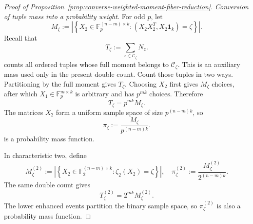 \documentclass[11pt]{article}
\newcommand{\F}{\mathbb F}
\newcommand{\1}{\mathbf 1}
\theoremstyle{plain}
\theoremstyle{definition}
\theoremstyle{remark}
\begin{document}
\begin{proof}[Proof of Proposition~\ref{prop:converse-weighted-moment-fiber-reduction}]
\smallskip
\noindent\emph{Conversion of tuple mass into a probability weight.}
For odd $p$, let
\begin{equation}
 M_{\zeta}:=
 \left|\left\{X_2\in\F_p^{(n-m)\times k}:
 (X_2X_2^T,X_2\1_k)=\zeta\right\}\right|.
 \label{eq:unreported-fiber-size}
\end{equation}
Recall that
\begin{equation}
 T_{\zeta}:=\sum_{z\in\mathcal C_{\zeta}}N_z.
 \label{eq:theorem-A-T-zeta}
\end{equation}
counts all ordered tuples whose full moment belongs to
$\mathcal C_{\zeta}$.  This is an auxiliary mass used only in the present
double count.  Count those tuples in two ways.  Partitioning by the full
moment gives $T_{\zeta}$.  Choosing $X_2$ first gives
$M_{\zeta}$ choices, after which $X_1\in\F_p^{m\times k}$ is arbitrary and
has $p^{mk}$ choices.  Therefore
\begin{equation}
 T_{\zeta}=p^{mk}M_{\zeta}.
 \label{eq:unreported-mass-identity}
\end{equation}
The matrices $X_2$ form a uniform sample space of size $p^{(n-m)k}$, so
\begin{equation}
 \pi_{\zeta}:=\frac{M_{\zeta}}{p^{(n-m)k}}.
 \label{eq:lower-block-probability}
\end{equation}
is a probability mass function.

In characteristic two, define
\begin{equation}
 M_{\zeta}^{(2)}
 :=\left|\left\{X_2\in\F_2^{(n-m)\times k}:
 \zeta_2(X_2)=\zeta\right\}\right|,
 \quad
 \pi_{\zeta}^{(2)}:=\frac{M_{\zeta}^{(2)}}{2^{(n-m)k}}.
 \label{eq:binary-lower-enhanced-probability}
\end{equation}
The same double count gives
\begin{equation}
 T_{\zeta}^{(2)}=2^{mk}M_{\zeta}^{(2)}.
 \label{eq:binary-enhanced-mass-identity}
\end{equation}
The lower enhanced events partition the binary sample space, so
$\pi_{\zeta}^{(2)}$ is also a probability mass function.


\end{proof}
\end{document}
